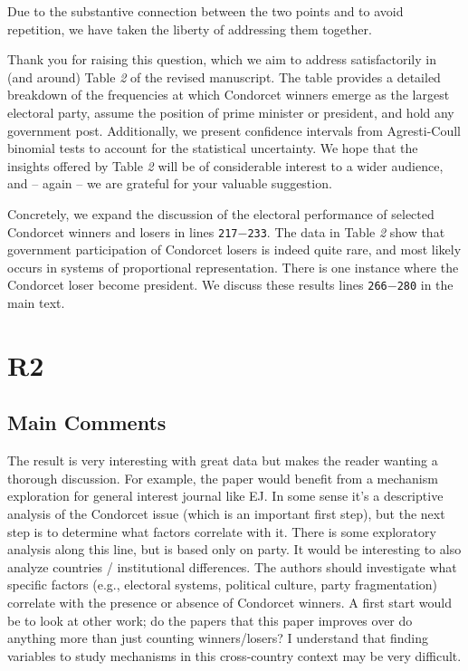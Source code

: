 \documentclass[a4paper, 12pt]{scrartcl}
\theoremstyle{break}
\newenvironment{changes}{\par\color{violet}\par\addvspace{\baselineskip}}{\par\addvspace{\baselineskip}}
\begin{document}
Due to the substantive connection between the two points and to avoid repetition, we have taken the liberty of addressing them together.

Thank you for raising this question, which we aim to address satisfactorily in (and around) Table \textit{2} of the revised manuscript. The table provides a detailed breakdown of the frequencies at which Condorcet winners emerge as the largest electoral party, assume the position of prime minister or president, and hold any government post. Additionally, we present %
confidence intervals
%
from Agresti-Coull binomial tests
%
to account for the statistical uncertainty. We hope that the insights offered by Table \textit{2} will be of considerable interest to a wider audience, and -- again -- we are grateful for your valuable suggestion.

Concretely, we expand the discussion of the electoral performance of selected Condorcet winners and losers in lines \texttt{217$-$233}. The data in Table \textit{2} show that government participation of Condorcet losers is indeed quite rare, and most likely occurs in systems of proportional representation. There is one instance where the Condorcet loser become president. We discuss these results lines \texttt{266$-$280} in the main text.


\newpage
\section*{R2}
\subsection*{Main Comments}
\begin{changes}
	The result is very interesting with great data but makes the reader wanting a thorough discussion. For example, the paper would benefit from a mechanism exploration for general interest journal like EJ. In some sense it’s a descriptive analysis of the Condorcet issue (which is an important first step), but the next step is to determine what factors correlate with it. There is some exploratory analysis along this line, but is based only on party. It would be interesting to also analyze countries / institutional differences. The authors should investigate what specific factors (e.g., electoral systems, political culture, party fragmentation) correlate with the presence or absence of Condorcet winners. A first start would be to look at other work; do the papers
	that this paper improves over do anything more than just counting winners/losers? I understand that finding variables to study mechanisms in this cross-country context may be very difficult.
\end{changes}
\end{document}
